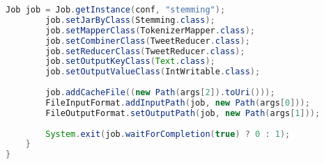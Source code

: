 \begin{lstlisting}[language=Java,basicstyle=\tiny,caption=Stemming.java]
        Job job = Job.getInstance(conf, "stemming");
        job.setJarByClass(Stemming.class);
        job.setMapperClass(TokenizerMapper.class);
        job.setCombinerClass(TweetReducer.class);
        job.setReducerClass(TweetReducer.class);
        job.setOutputKeyClass(Text.class);
        job.setOutputValueClass(IntWritable.class);
        
        job.addCacheFile((new Path(args[2]).toUri()));
        FileInputFormat.addInputPath(job, new Path(args[0]));
        FileOutputFormat.setOutputPath(job, new Path(args[1]));
        
        System.exit(job.waitForCompletion(true) ? 0 : 1);
    }
}

\end{lstlisting}